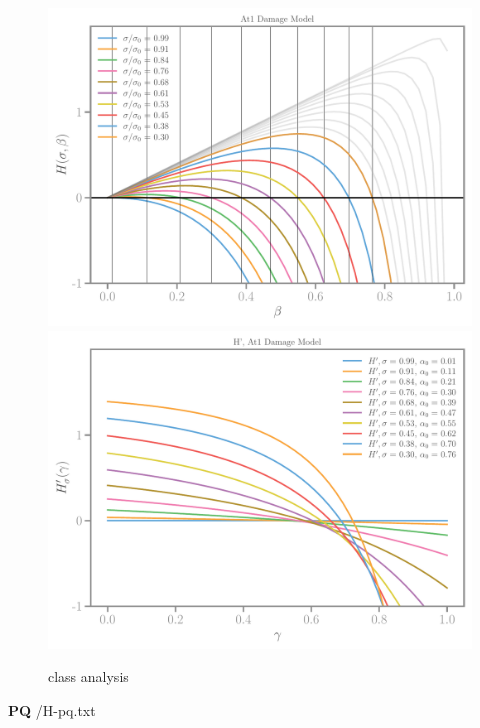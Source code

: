 \documentclass[]{article}
\begin{document}
\begin{figure}[htbp]
  \includegraphics[width=.33\textheight]{../figures/at1-Hbeta.pdf}
  \includegraphics[width=.33\textheight]{../figures/at1-H-prime-beta.pdf}
  \caption{class analysis}
  \label{fig:class-analyser}
\end{figure}
\textbf{PQ}
{/H-pq.txt}
\end{document}
